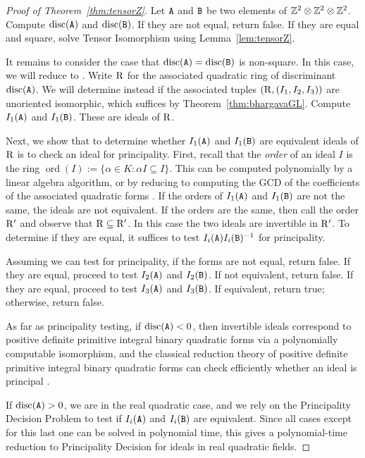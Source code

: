 \begin{proof}[Proof of Theorem~\ref{thm:tensorZ}]
Let $\mathtt{A}$ and $\mathtt{B}$ be two elements of $\mathbb{Z}^2 \otimes \mathbb{Z}^2 \otimes \mathbb{Z}^2$.  
Compute $\operatorname{disc}(\mathtt{A})$ and $\operatorname{disc}(\mathtt{B})$.  If they are not equal, return false.  
If they are equal and square, solve Tensor Isomorphism using Lemma~\ref{lem:tensorZ}.

	It remains to consider the case that $\operatorname{disc}(\mathtt{A}) = \operatorname{disc}(\mathtt{B})$ is non-square.
In this case, we will reduce  to .
	Write $\mathrm{R}$ for the associated quadratic ring of discriminant $\operatorname{disc}(\mathtt{A})$.
	We will determine instead if the associated tuples $(\mathrm{R}, (I_1,I_2,I_3))$ are unoriented isomorphic, which suffices by Theorem~\ref{thm:bhargavaGL}.
Compute $I_1(\mathtt{A})$ and $I_1(\mathtt{B})$.  These are ideals of $\mathrm{R}$.  

	Next, we show that to determine whether $I_1(\mathtt{A})$ and $I_1(\mathtt{B})$ are equivalent ideals of $\mathrm{R}$ is to check an ideal for principality.
	First, recall that the \emph{order} of an ideal $I$ is the ring $\operatorname{ord}(I) := \{ \alpha \in K : \alpha I \subseteq I \}$.  This can be computed polynomially by a linear algebra algorithm, or by reducing to computing the GCD of the coefficients of the associated quadratic forms \cite[Section 7.A]{Cox}.  If the orders of $I_1(\mathtt{A})$ and $I_1(\mathtt{B})$ are not the same, the ideals are not equivalent.  If the orders are the same, then call the order $\mathrm{R}'$ and observe that $\mathrm{R} \subseteq \mathrm{R}'$.  In this case the two ideals are invertible in $\mathrm{R}'$.   
	To determine if they are equal, it suffices to test $I_i(\mathtt{A}) I_i(\mathtt{B})^{-1}$ for principality.

	Assuming we can test for principality, if the forms are not equal, return false.  If they are equal, proceed to test $I_2(\mathtt{A})$ and $I_2(\mathtt{B})$.  If not equivalent, return false.  If they are equal, proceed to test $I_3(\mathtt{A})$ and $I_3(\mathtt{B})$.  If equivalent, return true; otherwise, return false.  

	As far as principality testing, if $\operatorname{disc}(\mathtt{A}) < 0$, then invertible ideals correspond to positive definite primitive integral binary quadratic forms via a polynomially computable isomorphism, and the classical reduction theory of positive definite primitive integral binary quadratic forms can check efficiently whether an ideal is principal \cite[Section 5.3.1]{Cohen}.

	If $\operatorname{disc}(\mathtt{A}) > 0$, we are in the real quadratic case, and we rely on the Principality Decision Problem to test if $I_i(\mathtt{A})$ and $I_i(\mathtt{B})$ are equivalent.  
	Since all cases except for this last one can be solved in polynomial time, this gives a polynomial-time reduction to Principality Decision for ideals in real quadratic fields.



\end{proof}
